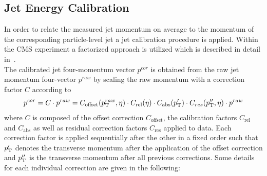 \subsection{Jet Energy Calibration}
\label{subsec:jets_calib}
In order to relate the measured jet momentum on average to the momentum of the corresponding particle-level jet a jet calibration procedure is applied. Within the CMS experiment a factorized approach is utilized which is described in detail in~\cite{1748-0221-6-11-P11002}. \\
The calibrated jet four-momentum vector $p^{cor}$ is obtained from the raw jet momentum four-vector $p^{raw}$ by scaling the raw momentum with a correction factor $C$ according to
\begin{equation}
p^{cor} = C \cdot p^{raw} = C_{\mathrm{offset}}(p_{\text{T}}^{raw}, \eta) \cdot C_{\mathrm{rel}}(\eta) \cdot C_{\mathrm{abs}}(p_{\text{T}}') \cdot C_{res}(p_{\text{T}}'', \eta) \cdot p^{raw}
\end{equation} 
 where $C$ is composed of the offset correction $C_{\mathrm{offset}}$, the calibration factors $C_{\mathrm{rel}}$ and $C_{\mathrm{abs}}$ as well as residual correction factors $C_{\mathrm{res}}$ applied to data. Each correction factor is applied sequentially after the other in a fixed order such that $p_{\text{T}}'$ denotes the transverse momentum after the application of the offset correction and $p_{\text{T}}''$ is the transverse momentum after all previous corrections. Some details for each individual correction are given in the following: 
